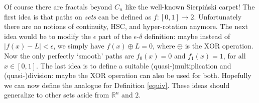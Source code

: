 \documentclass{article}
\theoremstyle{plain}
\begin{document}
Of course there are fractals beyond $C_n$ like the well-known Sierpiński carpet! The first idea is that paths on \textit{sets} can be defined as $f:[0,1] \rightarrow 2$. Unfortunately there are no notions of continuity, HSC, and hyper-rotation anymore. The next idea would be to modify the $\epsilon$ part of the $\epsilon$-$\delta$ definition: maybe instead of $|f(x)-L|<\epsilon$, we simply have $f(x) \oplus L = 0$, where $\oplus$ is the XOR operation. Now the only perfectly `smooth' paths are $f_0(x)=0$ and $f_1(x)=1$, for all $x\in[0,1]$. The last idea is to define a suitable (quasi-)multiplication and (quasi-)division: maybe the XOR operation can also be used for both. Hopefully we can now define the analogue for Definition \ref{equiv}. These ideas should generalize to other sets aside from $\mathbb{R}^n$ and $2$.



\end{document}
